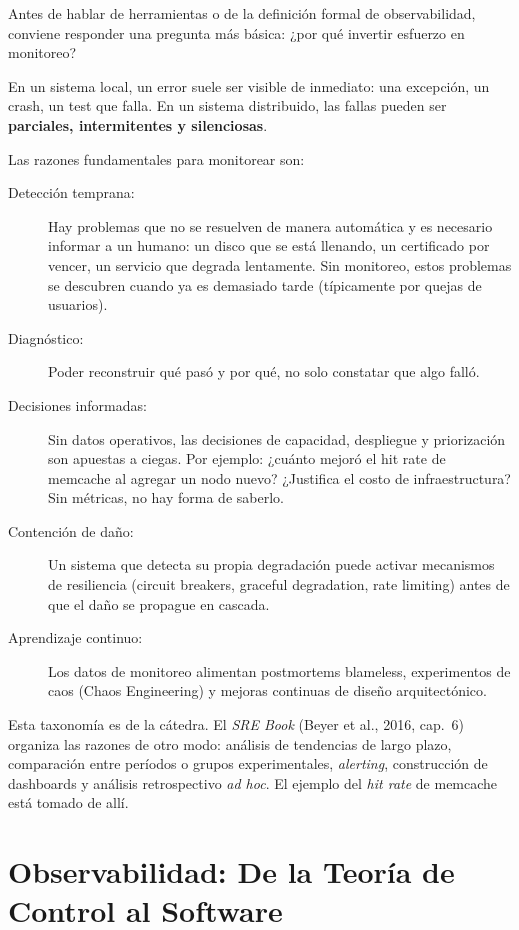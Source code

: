 \documentclass[variant=apuntes,cover=institutional,mode=screen]{ua-engineering-v6-article}
\begin{document}
Antes de hablar de herramientas o de la definición formal de observabilidad,
conviene responder una pregunta más básica: ¿por qué invertir esfuerzo en monitoreo?

En un sistema local, un error suele ser visible de inmediato: una excepción, un crash,
un test que falla. En un sistema distribuido, las fallas pueden ser \textbf{parciales,
intermitentes y silenciosas}.

Las razones fundamentales para monitorear son:

\begin{description}
\item[Detección temprana:] Hay problemas que no se resuelven de manera automática
y es necesario informar a un humano: un disco que se está llenando, un certificado
por vencer, un servicio que degrada lentamente. Sin monitoreo, estos problemas se
descubren cuando ya es demasiado tarde (típicamente por quejas de usuarios).
\item[Diagnóstico:] Poder reconstruir qué pasó y por qué, no solo constatar que algo falló.
\item[Decisiones informadas:] Sin datos operativos, las decisiones de capacidad,
despliegue y priorización son apuestas a ciegas. Por ejemplo: ¿cuánto mejoró el hit rate de
memcache al agregar un nodo nuevo? ¿Justifica el costo de infraestructura? Sin métricas, no hay forma
de saberlo.
\item[Contención de daño:] Un sistema que detecta su propia degradación puede activar
mecanismos de resiliencia (circuit breakers, graceful degradation, rate limiting) antes de que el
daño se propague en cascada.
\item[Aprendizaje continuo:] Los datos de monitoreo alimentan postmortems blameless, experimentos
de caos (Chaos Engineering) y mejoras continuas de diseño arquitectónico.
\end{description}

Esta taxonomía es de la cátedra. El \emph{SRE Book} (Beyer et al., 2016, cap.~6) organiza las razones de otro modo: análisis de tendencias de largo plazo, comparación entre períodos o grupos experimentales, \emph{alerting}, construcción de dashboards y análisis retrospectivo \emph{ad hoc}. El ejemplo del \emph{hit rate} de memcache está tomado de allí.

\section{Observabilidad: De la Teoría de Control al Software}
\end{document}
